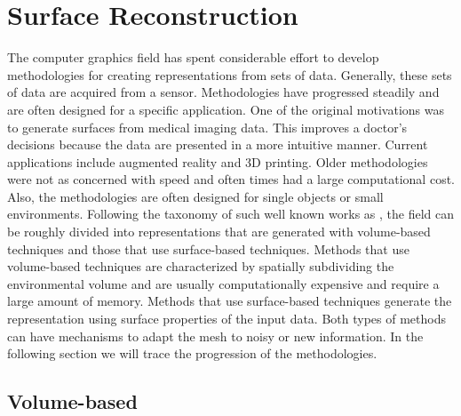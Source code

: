 \section{Surface Reconstruction}

The computer graphics field has spent considerable effort to develop
methodologies for creating representations from sets of data. Generally, these
sets of data are acquired from a sensor. Methodologies have progressed steadily
and are often designed for a specific application. One of the original
motivations was to generate surfaces from medical imaging data. This improves a
doctor's  decisions because the data are presented in a more intuitive manner.
Current applications include augmented reality and 3D printing. Older
methodologies were not as concerned with speed and often times had a large
computational cost. Also, the methodologies are often designed for single
objects or small environments. Following the taxonomy of such well known works
as \cite{Gopi2002,Mencl1997}, the field can be roughly divided into
representations that are generated with volume-based techniques and those that
use surface-based techniques. Methods that use volume-based techniques are
characterized by spatially subdividing the environmental volume and are usually
computationally expensive and require a large amount of memory. Methods that use
surface-based techniques generate the representation using surface properties of
the input data. Both types of methods can have mechanisms to adapt the mesh to
noisy or new information. In the following section we will trace the progression
of the methodologies.

\subsection{Volume-based}

